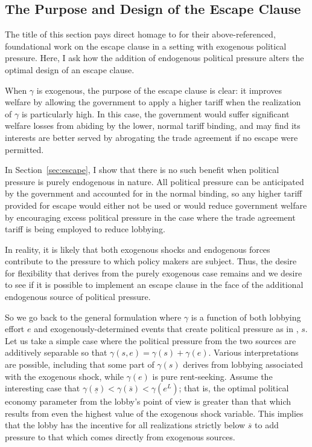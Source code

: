 \documentclass[12pt]{article}
\newcommand{\ov}{\overline}
\newcommand{\un}{\underline}
\newcommand{\ga}{\gamma}
\begin{document}
\subsection{The Purpose and Design of the Escape Clause}
\label{sec:escape2}
The title of this section pays direct homage to \Textcite{bs2005} for their above-referenced, foundational work on the escape clause in a setting with exogenous political pressure. Here, I ask how the addition of endogenous political pressure alters the optimal design of an escape clause.

When $\ga$ is exogenous, the purpose of the escape clause is clear: it improves welfare by allowing the government to apply a higher tariff when the realization of $\ga$ is particularly high. In this case, the government would suffer significant welfare losses from abiding by the lower, normal tariff binding, and may find its interests are better served by abrogating the trade agreement if no escape were permitted.

In Section~\ref{sec:escape}, I show that there is no such benefit when political pressure is purely endogenous in nature. All political pressure can be anticipated by the government and accounted for in the normal binding, so any higher tariff provided for escape would either not be used or would reduce government welfare by encouraging excess political pressure in the case where the trade agreement tariff is being employed to reduce lobbying.

In reality, it is likely that both exogenous shocks and endogenous forces contribute to the pressure to which policy makers are subject. Thus, the desire for flexibility that derives from the purely exogenous case remains and we desire to see if it is possible to implement an escape clause in the face of the additional endogenous source of political pressure.

So we go back to the general formulation where $\ga$ is a function of both lobbying effort $e$ and exogenously-determined events that create political pressure as in \Textcite{ms2011}, $s$. Let us take a simple case where the political pressure from the two sources are additively separable so that $\ga(s,e) = \ga(s) + \ga(e)$. Various interpretations are possible, including that some part of $\ga(s)$ derives from lobbying associated with the exogenous shock, while $\ga(e)$ is pure rent-seeking. Assume the interesting case that $\ga(\un{s}) < \ga(\ov{s}) < \ga(e^L)$; that is, the optimal political economy parameter from the lobby's point of view is greater than that which results from even the highest value of the exogenous shock variable. This implies that the lobby has the incentive for all realizations strictly below $\ov{s}$ to add pressure to that which comes directly from exogenous sources.
\end{document}
